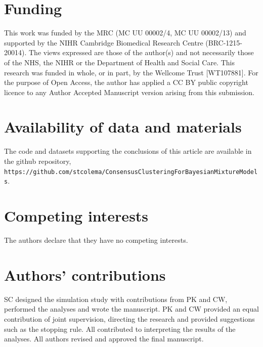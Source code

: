 \documentclass{bmcart}
\begin{document}
\begin{backmatter}
        
    \section*{Funding}%
    This work was funded by the MRC (MC UU 00002/4, MC UU 00002/13) and supported by the NIHR Cambridge Biomedical Research Centre (BRC-1215-20014). The views expressed are those of the author(s) and not necessarily those of the NHS, the NIHR or the Department of Health and Social Care. This research was funded in whole, or in part, by the Wellcome Trust [WT107881]. For the purpose of Open Access, the author has applied a CC BY public copyright licence to any Author Accepted Manuscript version arising from this submission.
    
    
    \section*{Availability of data and materials}%
    The code and datasets supporting the conclusions of this article are available in the github repository, \texttt{https://github.com/stcolema/ConsensusClusteringForBayesianMixtureModels}.

    \section*{Competing interests}
    The authors declare that they have no competing interests.
    
    
    \section*{Authors' contributions}
    SC designed the simulation study with contributions from PK and CW, performed the analyses and wrote the manuscript. PK and CW provided an equal contribution of joint supervision, directing the research and provided suggestions such as the stopping rule. All contributed to interpreting the results of the analyses. All authors revised and approved the final manuscript.
    

\end{backmatter}
\end{document}
